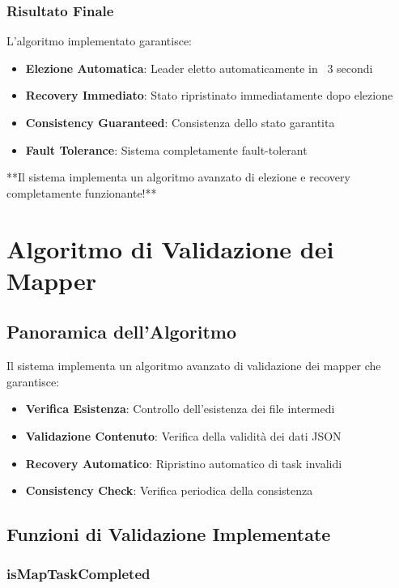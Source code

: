 \documentclass[12pt,a4paper]{article}
\begin{document}
\subsubsection{Risultato Finale}

L'algoritmo implementato garantisce:

\begin{itemize}
\item \textbf{Elezione Automatica}: Leader eletto automaticamente in ~3 secondi
\item \textbf{Recovery Immediato}: Stato ripristinato immediatamente dopo elezione
\item \textbf{Consistency Guaranteed}: Consistenza dello stato garantita
\item \textbf{Fault Tolerance}: Sistema completamente fault-tolerant
\end{itemize}

**Il sistema implementa un algoritmo avanzato di elezione e recovery completamente funzionante!** 🚀

\section{Algoritmo di Validazione dei Mapper}

\subsection{Panoramica dell'Algoritmo}

Il sistema implementa un algoritmo avanzato di validazione dei mapper che garantisce:

\begin{itemize}
\item \textbf{Verifica Esistenza}: Controllo dell'esistenza dei file intermedi
\item \textbf{Validazione Contenuto}: Verifica della validità dei dati JSON
\item \textbf{Recovery Automatico}: Ripristino automatico di task invalidi
\item \textbf{Consistency Check}: Verifica periodica della consistenza
\end{itemize}

\subsection{Funzioni di Validazione Implementate}

\subsubsection{isMapTaskCompleted}
\end{document}
